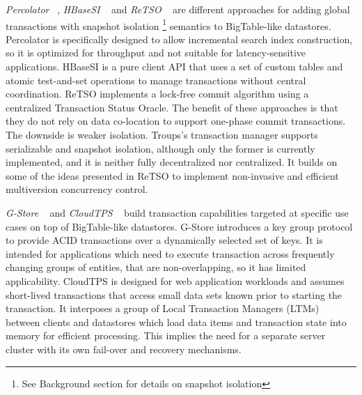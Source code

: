 \documentclass[10pt,final,journal]{IEEEtran}
\begin{document}
\emph{Percolator} ~\cite{Peng:2010:LIP:1924943.1924961}, \emph{HBaseSI} ~\cite{Zhang:2010:5697970} and \emph{ReTSO} ~\cite{Junqueira:2011:LTS:2056318.2057148} are different approaches for adding global transactions with snapshot isolation \footnote{See Background section for details on snapshot isolation} semantics to BigTable-like datastores. Percolator is specifically designed to allow incremental search index construction, so it is optimized for throughput and not suitable for latency-sensitive applications. HBaseSI is a pure client API that uses a set of custom tables and atomic test-and-set operations to manage transactions without central coordination. ReTSO implements a lock-free commit algorithm using a centralized Transaction Status Oracle. The benefit of these approaches is that they do not rely on data co-location to support one-phase commit transactions. The downside is weaker isolation. Troups's transaction manager supports serializable and snapshot isolation, although only the former is currently implemented, and it is neither fully decentralized nor centralized. It builds on some of the ideas presented in ReTSO to implement non-invasive and efficient multiversion concurrency control.

\emph{G-Store} ~\cite{Das:2010:GSD:1807128.1807157} and \emph{CloudTPS} ~\cite{Wei:2011:5740834} build transaction capabilities targeted at specific use cases on top of BigTable-like datastores. G-Store introduces a key group protocol to provide ACID transactions over a dynamically selected set of keys. It is intended for applications which need to execute transaction across frequently changing groups of entities, that are non-overlapping, so it has limited applicability. CloudTPS is designed for web application workloads and assumes short-lived transactions that access small data sets known prior to starting the transaction. It interposes a group of Local Transaction Managers (LTMs) between clients and datastores which load data items and transaction state into memory for efficient processing. This implies the need for a separate server cluster with its own fail-over and recovery mechanisms.
\end{document}
